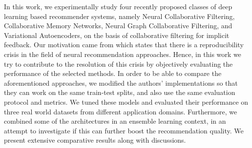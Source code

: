In this work, we experimentally study four recently proposed classes of deep learning based recommender systems, namely Neural Collaborative Filtering, Collaborative Memory Networks, Neural Graph Collaborative Filtering, and Variational Autoencoders, on the basis of collaborative filtering for implicit feedback.
Our motivation came from \cite{dacrema2019we} which states that there is a reproducibility crisis in the field of neural recommendation approaches.
Hence, in this work we try to contribute to the resolution of this crisis by objectively evaluating the performance of the selected methods.
In order to be able to compare the aforementioned approaches, we modified the authors' implementations so that they can work on the same train-test splits, and also use the same evaluation protocol and metrics.
We tuned these models and evaluated their performance on three real world datasets from different application domains.
Furthermore, we combined some of the architectures in an ensemble learning context, in an attempt to investigate if this can further boost the recommendation quality.
We present extensive comparative results along with discussions.
